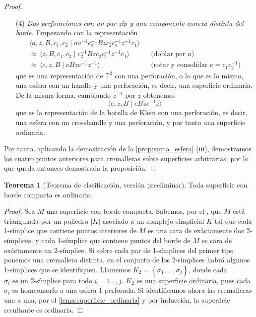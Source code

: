 \documentclass[10pt]{report}
\newcommand{\Toro}{\mathbb{T}^2}
\theoremstyle{definition}
\newtheorem{tma}[defin]{Teorema}
\begin{document}
\begin{proof}
\begin{itemize}
\item[(4)] \textit{Dos perforaciones con un par-zip y una componente conexa distinta del borde.} Empezando con la representación
\begin{align*}
\langle a,z,B,c_1,c_2\mid aa^{-1} c_2^{-1}Bzc_2c_1^{-1}z^{-1}c_1\rangle & & \\
\approx  \, \langle z,B,c_1,c_2\mid c_2^{-1}Bzc_2c_1^{-1}z^{-1}c_1\rangle &&\text{(doblar por } a\text{)}\\
\approx  \, \langle e,z,B\mid eBze^{-1}z^{-1}\rangle &&\text{(rotar y consolidar } e=c_1c_2^{-1} \text{)}
\end{align*}
que es una representación de $\Toro$ con una perforación, o lo que es lo mismo, una esfera con un handle y una perforación, es decir, una superficie ordinaria. De la misma forma, cambiando $z^{-1}$ por $z$ obtenemos
\[
\langle e,z,B\mid eBze^{-1}z\rangle
\]
que es la representación de la botella de Klein con una perforación, es decir, una esfera con un crosshandle y una perforación, y por tanto una superficie ordinaria.
\end{itemize}
Por tanto, aplicando la demostración de la \autoref{prop:suma_esfera} (iii), demostramos los cuatro puntos anteriores para cremalleras sobre superficies arbitrarias, por lo que queda entonces demostrada la proposición.

\end{proof}


\begin{tma}[Teorema de clasificación, versión preeliminar] %
Toda superficie con borde compacta es ordinaria.
\end{tma}
\begin{proof}
Sea $M$ una superficie con borde compacta. Sabemos, por el , que $M$ está triangulada por un poliedro $|K|$ asociado a un complejo simplicial $K$ tal que cada 1-símplice que contiene puntos interiores de $M$ es una cara de exáctamente dos 2-símplices, y cada 1-símplice que contiene puntos del borde de $M$ es cara de exáctamente un 2-símplice. Si sobre cada par de 1-símplices del primer tipo ponemos una cremallera distinta, en el conjunto de los 2-símplices habrá algunos 1-símplices que se identifiquen. Llamemos $K_2=\left\{\sigma_1,\dots ,\sigma_j\right\}$, donde cada $\sigma_i \text{ es un 2-símplice para todo } i=1\dots ,j$. $K_2$ es una superficie ordinaria, pues cada $\sigma_i$ es homeomorfo a una esfera 1-perforada. Si identificamos ahora las cremalleras una a una, por el \autoref{lema:superficie_ordinaria} y por inducción, la superficie resultante es ordinaria.
\end{proof}
\end{document}
